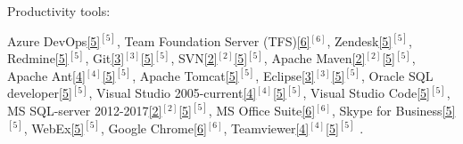 \begin{cventries}
  \cventry
    {Productivity tools:} %
    {} %
    {} %
    {} %
    {
      \begin{cvitems} %
        \item {        
        Azure DevOps\ref{5}{$^{[5]}$},         
        Team Foundation Server (TFS)\ref{6}{$^{[6]}$},
        Zendesk\ref{5}{$^{[5]}$},
        Redmine\ref{5}{$^{[5]}$},  
        Git\ref{3}{$^{[3]}$}\ref{5}{$^{[5]}$}, 
        SVN\ref{2}{$^{[2]}$}\ref{5}{$^{[5]}$},
        Apache Maven\ref{2}{$^{[2]}$}\ref{5}{$^{[5]}$},
        Apache Ant\ref{4}{$^{[4]}$}\ref{5}{$^{[5]}$},  
        Apache Tomcat\ref{5}{$^{[5]}$},  
        Eclipse\ref{3}{$^{[3]}$}\ref{5}{$^{[5]}$},  
        Oracle SQL developer\ref{5}{$^{[5]}$},
        Visual Studio 2005-current\ref{4}{$^{[4]}$}\ref{5}{$^{[5]}$},
        Visual Studio Code\ref{5}{$^{[5]}$},
        MS SQL-server 2012-2017\ref{2}{$^{[2]}$}\ref{5}{$^{[5]}$},
        MS Office Suite\ref{6}{$^{[6]}$},
        Skype for Business\ref{5}{$^{[5]}$},
        WebEx\ref{5}{$^{[5]}$},
        Google Chrome\ref{6}{$^{[6]}$},        
        Teamviewer\ref{4}{$^{[4]}$}\ref{5}{$^{[5]}$}%
        .}       
      \end{cvitems}
    }  
  \vspace{-0.4cm}  
    

\end{cventries}
